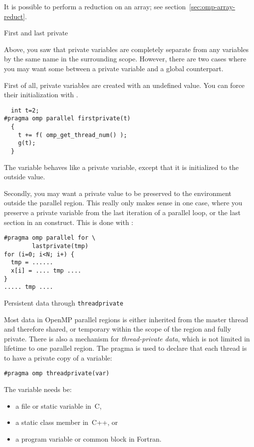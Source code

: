 It is possible to perform a reduction on an array;
see section~\ref{sec:omp-array-reduct}.

 {First and last private}

Above, you saw that private variables are completely separate from any
variables by the same name in the surrounding scope. However, there
are two cases where you may want some 
between a private variable and a global counterpart.

First of all, private variables are created with an undefined value.
You can force their initialization with .
\begin{lstlisting}
  int t=2;
#pragma omp parallel firstprivate(t)
  {
    t += f( omp_get_thread_num() );
    g(t);
  }
\end{lstlisting}
The variable  behaves like a private variable, except that it is
initialized to the outside value.

Secondly, you may want a private value to be preserved to the
environment outside the parallel region. This really only makes sense
in one case, where you
preserve a private variable
from the last iteration of a parallel loop, or the last section in an
 construct. This is done with :
\begin{lstlisting}
#pragma omp parallel for \
        lastprivate(tmp)
for (i=0; i<N; i+) {
  tmp = ......
  x[i] = .... tmp ....
}
..... tmp ....
\end{lstlisting}

 {Persistent data through \texttt{threadprivate}}
\label{sec:threadprivate}

Most data in OpenMP parallel regions is either inherited
from the master thread and therefore shared, or temporary within the scope of the
region and fully private.
There is also a mechanism for \emph{thread-private
  data},
which is not limited in lifetime to one parallel region.
The  pragma is used to declare that each thread
is to have a private copy of a variable:
\begin{lstlisting}
#pragma omp threadprivate(var)
\end{lstlisting}
The variable needs be:
\begin{itemize}
\item a file or static variable in~C,
\item a static class member in~C++, or
\item a program variable or common block in Fortran.
\end{itemize}

